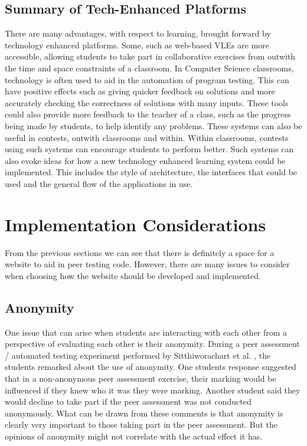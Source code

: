\documentclass[a4paper,11pt]{report}
\begin{document}
\subsection{Summary of Tech-Enhanced Platforms}
There are many advantages, with respect to learning, brought forward by technology enhanced platforms. Some, such as web-based VLEs are more accessible, allowing students to take part in collaborative exercises from outwith the time and space constraints of a classroom. In Computer Science classrooms, technology is often used to aid in the automation of program testing. This can have positive effects such as giving quicker feedback on solutions and more accurately checking the correctness of solutions with many inputs. These tools could also provide more feedback to the teacher of a class, such as the progress being made by students, to help identify any problems. These systems can also be useful in contests, outwith classrooms and within. Within classrooms, contests using such systems can encourage students to perform better. Such systems can also evoke ideas for how a new technology enhanced learning system could be implemented. This includes the style of architecture, the interfaces that could be used and the general flow of the applications in use.\par




\section{Implementation Considerations}
From the previous sections we can see that there is definitely a space for a website to aid in peer testing code. However, there are many issues to consider when choosing how the website should be developed and implemented.

\subsection{Anonymity}
One issue that can arise when students are interacting with each other from a perspective of evaluating each other is their anonymity. During a peer assessment / automated testing experiment performed by Sitthiworachart et al. \cite{sitthiworachart_effective_2004}, the students remarked about the use of anonymity. One students response suggested that in a non-anonymous peer assessment exercise, their marking would be influenced if they knew who it was they were marking. Another student said they would decline to take part if the peer assessment was not conducted anonymously. What can be drawn from these comments is that anonymity is clearly very important to those taking part in the peer assessment. But the opinions of anonymity might not correlate with the actual effect it has.\par
\end{document}
